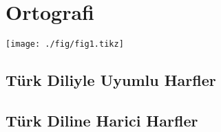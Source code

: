 \chapter{Ortografi}

% 

% 
\texttt{[image: ./fig/fig1.tikz]}
\section{Türk Diliyle Uyumlu Harfler}

\section{Türk Diline Harici Harfler}





